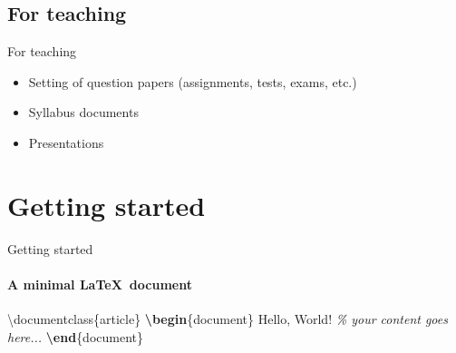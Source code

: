 \documentclass[,aspectratio=43]{beamer}
\newcommand{\VERB}{\Verb[commandchars=\\\{\}]}
\newenvironment{Shaded}{\begin{snugshade}}{\end{snugshade}}
\newcommand{\BuiltInTok}[1]{#1}
\newcommand{\CommentTok}[1]{\textcolor[rgb]{0.38,0.63,0.69}{\textit{#1}}}
\newcommand{\ExtensionTok}[1]{#1}
\newcommand{\KeywordTok}[1]{\textcolor[rgb]{0.00,0.44,0.13}{\textbf{#1}}}
\newcommand{\NormalTok}[1]{#1}
\providecommand{\tightlist}{%
  \setlength{\itemsep}{0pt}\setlength{\parskip}{0pt}}
\begin{document}
\hypertarget{for-teaching}{%
\subsection{For teaching}\label{for-teaching}}

\begin{frame}{For teaching}
\begin{itemize}
\tightlist
\item
  Setting of question papers (assignments, tests, exams, etc.)
\item
  Syllabus documents
\item
  Presentations
\end{itemize}
\end{frame}

\hypertarget{getting-started}{%
\section{Getting started}\label{getting-started}}

\begin{frame}[fragile]{Getting started}
\framesubtitle{A minimal \LaTeX\ document}

\begin{Shaded}
\begin{Highlighting}[]
\BuiltInTok{\textbackslash{}documentclass}\NormalTok{\{}\ExtensionTok{article}\NormalTok{\}}
\KeywordTok{\textbackslash{}begin}\NormalTok{\{}\ExtensionTok{document}\NormalTok{\}}
\NormalTok{Hello, World!  }\CommentTok{\% your content goes here...}
\KeywordTok{\textbackslash{}end}\NormalTok{\{}\ExtensionTok{document}\NormalTok{\}}
\end{Highlighting}
\end{Shaded}

\end{frame}
\end{document}
